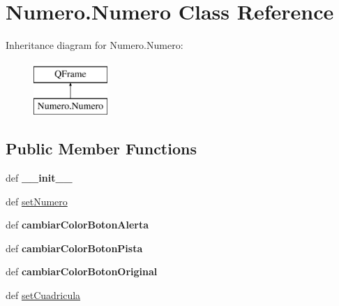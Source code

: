 \hypertarget{class_numero_1_1_numero}{\section{Numero.\-Numero Class Reference}
\label{class_numero_1_1_numero}
}
Inheritance diagram for Numero.\-Numero\-:\begin{figure}[H]
\begin{center}
\leavevmode
\includegraphics[height=2.000000cm]{class_numero_1_1_numero}
\end{center}
\end{figure}
\subsection*{Public Member Functions}
\begin{DoxyCompactItemize}
\item 
\hypertarget{class_numero_1_1_numero_a9f17c96d676757e0b155e88537e3abb3}{def {\bfseries \-\_\-\-\_\-init\-\_\-\-\_\-}}\label{class_numero_1_1_numero_a9f17c96d676757e0b155e88537e3abb3}

\item 
def \hyperlink{class_numero_1_1_numero_a818d0986e959bc7475473acba2c9db52}{set\-Numero}
\item 
\hypertarget{class_numero_1_1_numero_ae0fd65c2f86d7dd2bb094b35fcd85ab6}{def {\bfseries cambiar\-Color\-Boton\-Alerta}}\label{class_numero_1_1_numero_ae0fd65c2f86d7dd2bb094b35fcd85ab6}

\item 
\hypertarget{class_numero_1_1_numero_af740b535557fcd6bde1e43888e05a2fa}{def {\bfseries cambiar\-Color\-Boton\-Pista}}\label{class_numero_1_1_numero_af740b535557fcd6bde1e43888e05a2fa}

\item 
\hypertarget{class_numero_1_1_numero_ab1f9269d0aa574800961da32f7f95f16}{def {\bfseries cambiar\-Color\-Boton\-Original}}\label{class_numero_1_1_numero_ab1f9269d0aa574800961da32f7f95f16}

\item 
def \hyperlink{class_numero_1_1_numero_a6ec5c677a3f7d8166aacf84b102eee0d}{set\-Cuadricula}
\end{DoxyCompactItemize}
